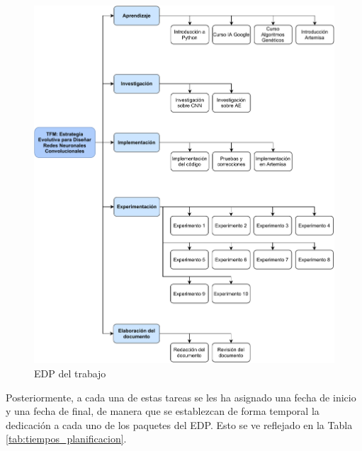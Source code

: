 \begin{figure}[!h]
    \centering
    \includegraphics[width=\textwidth]{figuras/planificacion/EDP.pdf}
    \caption{EDP del trabajo}
    \label{fig:edp}
\end{figure}


Posteriormente, a cada una de estas tareas se les ha asignado una fecha de inicio y una fecha de final, de manera que se establezcan de forma temporal la dedicación a cada uno de los paquetes del EDP. Esto se ve reflejado en la Tabla \ref{tab:tiempos_planificacion}.



